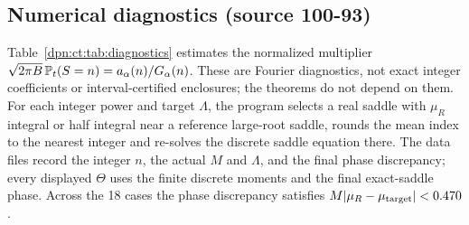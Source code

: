 \documentclass[11pt]{article}
\numberwithin{equation}{section}
\theoremstyle{definition}\newtheorem{definition}[theorem]{Definition}
\theoremstyle{remark}\newtheorem{remark}[theorem]{Remark}
\newcommand{\src}[1]{\textup{(source #1)}}
\begin{document}
\subsection{Numerical diagnostics \src{100-93}}\label{dpn:ct:sec:diagnostics}
Table~\ref{dpn:ct:tab:diagnostics} estimates the normalized multiplier
$\sqrt{2\pi B}\,\mathbb P_t(S=n)=a_\alpha(n)/G_\alpha(n)$.  These are Fourier
diagnostics, not exact integer coefficients or interval-certified enclosures;
the theorems do not depend on them.  For each integer power and target
$\Lambda$, the program selects a real saddle with $\mu_R$ integral or half
integral near a reference large-root saddle, rounds the mean index to the
nearest integer and re-solves the discrete saddle equation there.  The data
files record the integer $n$, the actual $M$ and $\Lambda$, and the final
phase discrepancy; every displayed $\Theta$ uses the finite discrete moments
and the final exact-saddle phase.  Across the 18 cases the phase discrepancy
satisfies $M|\mu_R-\mu_{\rm target}|<0.470$.
\end{document}
